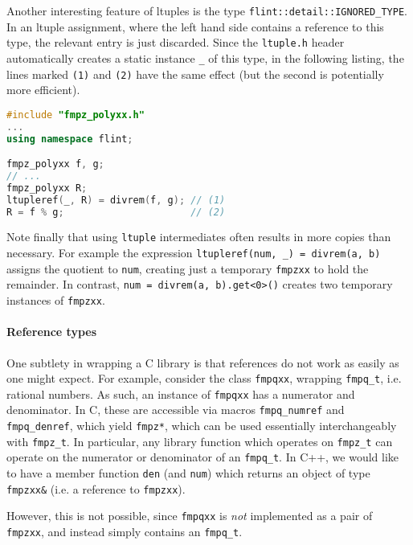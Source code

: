\documentclass[a4paper,10pt]{book}
\newcommand{\code}{\lstinline}
\begin{document}
{{Another interesting feature of ltuples is the type
\code{flint::detail::IGNORED_TYPE}.
In an ltuple assignment, where the left hand side contains a reference to this
type, the relevant entry is just discarded. Since the \code{ltuple.h} header
automatically creates a static instance \code{_} of this type,
in the following listing, the
lines marked \code{(1)} and \code{(2)} have the same effect (but the second is
potentially more efficient).

\begin{lstlisting}[language=c++]
#include "fmpz_polyxx.h"
...
using namespace flint;

fmpz_polyxx f, g;
// ...
fmpz_polyxx R;
ltupleref(_, R) = divrem(f, g); // (1)
R = f % g;                      // (2)
\end{lstlisting}

Note finally that using \code{ltuple} intermediates often results in more copies
than necessary. For example the expression
\code{ltupleref(num, _) = divrem(a, b)} assigns the quotient to \code{num},
creating just a temporary \code{fmpzxx} to hold the remainder. In contrast,
\code{num = divrem(a, b).get<0>()} creates two temporary instances of
\code{fmpzxx}.

\paragraph{Reference types}

One subtlety in wrapping a C library is that references do not work as easily as
one might expect. For example, consider the class \code{fmpqxx}, wrapping
\code{fmpq_t}, i.e. rational numbers. As such, an instance of \code{fmpqxx} has a
numerator and denominator. In C, these are accessible via macros
\code{fmpq_numref} and \code{fmpq_denref}, which yield \code{fmpz*}, which can
be used essentially interchangeably with \code{fmpz_t}. In particular, any
library function which operates on \code{fmpz_t} can operate on the numerator or
denominator of an \code{fmpq_t}. In C++, we would like to have a member function
\code{den} (and \code{num}) which returns an object of type \code{fmpzxx&} (i.e.
a reference to \code{fmpzxx}).

However, this is not possible, since \code{fmpqxx} is \emph{not} implemented as
a pair of \code{fmpzxx}, and instead simply contains an \code{fmpq_t}.

}}
\end{document}
